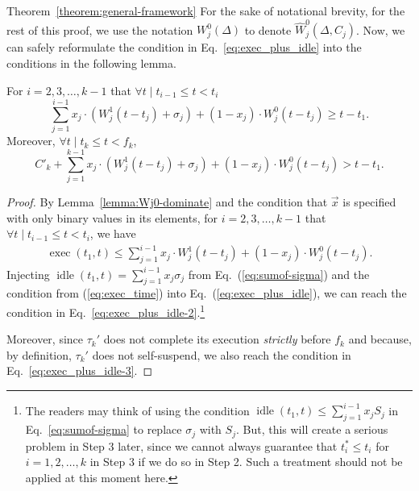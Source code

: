 \begin{appProof}{Theorem~\ref{theorem:general-framework}}
For the sake of notational brevity, for the rest of this proof, we use the notation $W_j^0(\Delta)$ to denote $\widehat{W}_j^0(\Delta, C_j)$.
Now, we can safely reformulate the condition in Eq.~\eqref{eq:exec_plus_idle} into the conditions in the following lemma.
\begin{Lemma}
  \label{lemma:conclusion-step2}
For $i=2,3,\ldots,k-1$ that $\forall t \mid t_{i-1} \leq t < t_i$
\begin{equation}
\label{eq:exec_plus_idle-2}
\sum_{j=1}^{i-1} x_j\cdot (W_j^1(t-t_j) +\sigma_j) + (1-x_j)\cdot W_j^0(t-t_j) \geq t-t_1.
\end{equation}
 Moreover, $\forall t \mid t_k \leq t < f_k$,
\begin{equation}
\label{eq:exec_plus_idle-3}
C'_k +\sum_{j=1}^{k-1} x_j\cdot (W_j^1(t-t_j) +\sigma_j) + (1-x_j)\cdot W_j^0(t-t_j) > t-t_1.
\end{equation} 
\end{Lemma}
\begin{proof}
  By Lemma~\ref{lemma:Wj0-dominate} and the condition that $\vec{x}$
  is specified with only binary values in its elements, for
  $i=2,3,\ldots,k-1$ that $\forall t \mid t_{i-1} \leq t < t_i$, we
  have
{\small \begin{align}
\label{eq:exec_time}
\operatorname{exec}(t_1, t) \leq \sum_{j=1}^{i-1} x_j\cdot W_j^1(t-t_j)  + (1-x_j)\cdot W_j^0(t-t_j).
\end{align}} Injecting $\operatorname{idle}(t_1, t) = \sum_{j=1}^{i-1}
x_j \sigma_j $ from Eq.~(\ref{eq:sumof-sigma}) and the condition from
(\ref{eq:exec_time}) into Eq.~(\ref{eq:exec_plus_idle}), we can reach
the condition in Eq.~\eqref{eq:exec_plus_idle-2}.\footnote{\label{footnote-why-sigma}The readers
  may think of using the condition $\operatorname{idle}(t_1, t) \leq
  \sum_{j=1}^{i-1} x_j S_j$ in Eq.~\eqref{eq:sumof-sigma} to
  replace $\sigma_j$ with $S_j$. But, this will create a serious
  problem in Step 3 later, since we cannot always guarantee that
  $t_i^*\leq t_i$ for $i=1,2,\ldots,k$ in Step 3 if we do so in Step 2. Such a treatment should not be applied at this moment here.} 

Moreover, since $\tau_k'$ does not complete its execution \emph{strictly} before $f_k$
and because, by definition, $\tau_k'$ does not self-suspend, we also
reach the condition in Eq.~\eqref{eq:exec_plus_idle-3}.
\end{proof}





\end{appProof}
